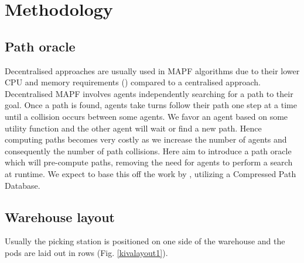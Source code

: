 \documentclass[a4paper,11pt]{article}
\begin{document}

\section{Methodology}
\label{Research}
\subsection{Path oracle}

Decentralised approaches are usually used in MAPF algorithms due to their lower CPU and memory requirements (\cite{wang2009bridging}) compared to a centralised approach. Decentralised MAPF involves agents independently searching for a path to their goal. Once a path is found, agents take turns follow their path one step at a time until a collision occurs between some agents. We favor an agent based on some utility function and the other agent will wait or find a new path. Hence computing paths becomes very costly as we increase the number of agents and consequently the number of path collisions. Here aim to introduce a path oracle which will pre-compute paths, removing the need for agents to perform a search at runtime. We expect to base this off the work by \cite{strasser2015compressing}, utilizing a Compressed Path Database.


\subsection{Warehouse layout}
\label{warehouselayout}
Usually the picking station is positioned on one side of the warehouse and the pods are laid out in rows (Fig. \ref{kivalayout1}).
\end{document}
